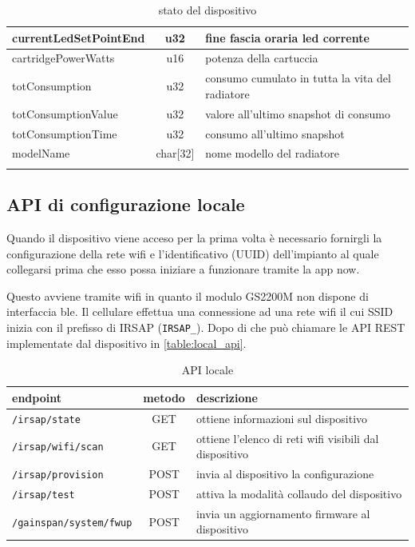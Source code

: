 \documentclass[12pt,a4paper,twoside,titlepage]{book}
\begin{document}
\begin{center}
\begin{longtable}{| p{5cm} | c | p{8cm} |}
    currentLedSetPointEnd & u32 & fine fascia oraria \acrshort{led} corrente\\ \hline
    cartridgePowerWatts & u16 & potenza della cartuccia\\ \hline
    totConsumption & u32 & consumo cumulato in tutta la vita del radiatore\\ \hline
    totConsumptionValue & u32 & valore all’ultimo snapshot di consumo\\ \hline
    totConsumptionTime & u32 & consumo all’ultimo snapshot\\ \hline
    modelName & char[32] & nome modello del radiatore\\ \hline
    \caption{stato del dispositivo}
    \label{table:device_state}
\end{longtable}
\end{center}

\subsection{API di configurazione locale}

Quando il dispositivo viene acceso per la prima volta è necessario fornirgli la
configurazione della rete \Gls{wifi} e l'identificativo (UUID) dell'impianto al quale
collegarsi prima che esso possa iniziare a funzionare tramite la app \Gls{now}.

Questo avviene tramite \Gls{wifi} in quanto il modulo GS2200M non dispone di interfaccia 
\acrshort{ble}. Il cellulare effettua una connessione ad una rete \Gls{wifi} il cui 
SSID inizia con il prefisso di IRSAP (\texttt{IRSAP\_}). Dopo di che può chiamare 
le API REST implementate dal dispositivo in \autoref{table:local_api}. 

\begin{table}
    \centering
    \begin{tabular}{| l | c | p{6cm} |}
        \hline 
        \textbf{endpoint} & \textbf{metodo} & \textbf{descrizione} \\ \hline 
        \texttt{/irsap/state} & GET & ottiene informazioni sul dispositivo \\ \hline 
        \texttt{/irsap/wifi/scan} & GET & ottiene l'elenco di reti \Gls{wifi} visibili dal dispositivo \\ \hline 
        \texttt{/irsap/provision} & POST & invia al dispositivo la configurazione \\ \hline 
        \texttt{/irsap/test} & POST & attiva la modalità collaudo del dispositivo \\ \hline 
        \texttt{/gainspan/system/fwup} & POST & invia un aggiornamento \gls{firmware} al dispositivo \\ \hline
    \end{tabular}
    \caption{API locale}
    \label{table:local_api}
\end{table}
\end{document}
